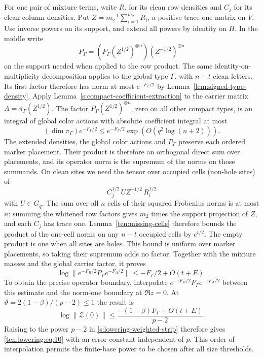 For one pair of mixture terms, write $R_i$ for its clean row
densities and $C_j$ for its clean column densities. Put
$Z=m_2^{-1}\sum_{i=1}^{m_2}R_i$, a positive trace-one matrix on $V$.
Use inverse powers on its support, and extend all powers by identity
on $H$. In the middle write
\[
       P_\Gamma=(P_\Gamma (Z^{1/2})^{\otimes n})
                      (Z^{-1/2})^{\otimes n}
\]
on the support needed when applied to the row product. The same
identity-on-multiplicity decomposition applies to the global type
$\Gamma$, with $n-t$ clean letters. Its first factor therefore has
norm at most $e^{-F_\Gamma/2}$ by
Lemma~\ref{lem:signed-type-density}. Apply
Lemma~\ref{s:compact-coefficient-extraction} to the carrier matrix
$A=\pi_\Gamma(Z^{1/2})$. The factor
$P_\Gamma(Z^{1/2})^{\otimes n}$, zero on all other compact types,
is an integral of global color actions with absolute coefficient
integral at most
\[
 (\dim\pi_\Gamma)e^{-F_\Gamma/2}
 \le e^{-F_\Gamma/2}\exp(O(q^2\log(n+2))).
\]
The extended densities, the global color actions and $P_\Gamma$
preserve each ordered marker placement. Their product is therefore
an orthogonal direct sum over placements, and its operator norm is
the supremum of the norms on those summands. On clean sites we need
the tensor over occupied cells (non-hole sites) of
\[
              C_j^{1/2}\, U Z^{-1/2}\, R_i^{1/2}
\]
with $U\in G_q$. The sum over all $n$ cells of their squared
Frobenius norms is at most $n$: summing the whitened row factors
gives $m_2$ times the support projection of $Z$, and each $C_j$ has
trace one. Lemma~\ref{ten:missing-cells} therefore bounds the product
of the one-cell norms on any $n-t$ occupied cells by $e^{t/2}$.
The empty product is one when all sites are holes. This bound is
uniform over marker placements, so taking their supremum adds no
factor. Together with the mixture masses and the global carrier
factor, it proves
\[
 \log\|e^{-F_B/2}P_\Gamma e^{-F_A/2}\|
 \le-F_\Gamma/2+O(t+E).
\]
To obtain the precise operator boundary, interpolate
$e^{-zF_B/2}P_\Gamma e^{-zF_A/2}$ between this estimate and the
norm-one boundary at $\Re z=0$. At
$\vartheta=2(1-\beta)/(p-2)\le1$ the result is
\[
 \log\|\mathcal Z(0)\|\le
 \frac{-(1-\beta)F_\Gamma+O(t+E)}{p-2}.
\]
Raising to the power $p-2$ in \eqref{s:lowering-weighted-strip}
therefore gives \eqref{ten:lowering:eq:10} with an error constant
independent of $p$. This order of interpolation permits the finite-base
power to be chosen after all size thresholds.

